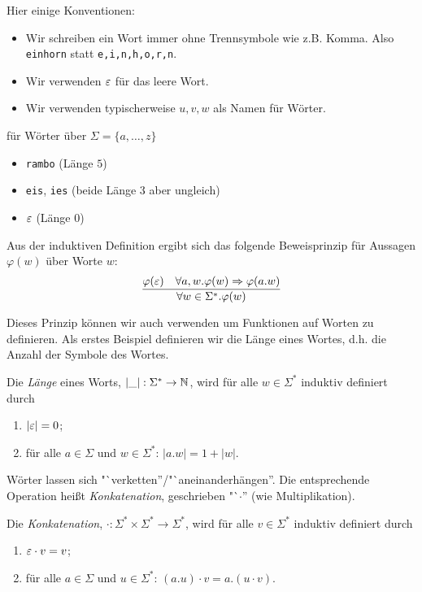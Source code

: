 Hier einige Konventionen:
\begin{itemize}
\item Wir schreiben ein Wort immer ohne Trennsymbole wie
  z.B. Komma. Also \texttt{einhorn} statt \texttt{e,i,n,h,o,r,n}.
\item Wir verwenden $\varepsilon$ für das leere Wort.
\item Wir verwenden typischerweise $u,v,w$ als Namen für Wörter.
\end{itemize}

\goodbreak

\begin{Bsp*} für Wörter über $\Sigma=\{a,\dots,z\}$
  \begin{itemize}
  \item \verb/rambo/ (Länge $5$)
  \item \verb/eis/, \verb/ies/ (beide Länge 3 aber ungleich) 
  \item $\varepsilon$ (Länge $0$)
  \qedhere
  \end{itemize}
\end{Bsp*}

Aus der induktiven Definition ergibt sich das folgende Beweisprinzip
für Aussagen $\varphi(w)$ über Worte $w$:
\begin{displaymath}
  \frac{\varphi(\varepsilon) \quad \forall a,w. \varphi(w) \Rightarrow \varphi(a.w)}{\forall w\in\Sigma^*.\varphi(w)}
\end{displaymath}

Dieses Prinzip können wir auch verwenden um Funktionen auf Worten zu
definieren. Als erstes Beispiel definieren wir die Länge eines Wortes,
d.h. die Anzahl der Symbole des Wortes.
\begin{Def}
  Die \emph{Länge} eines Worts, $|\_| : \Sigma^* \to \mathbb{N}$, wird für
  alle $w \in \Sigma^*$ induktiv definiert durch
  \begin{enumerate}
  \item $|\varepsilon| = 0$;
  \item für alle $a\in\Sigma$ und $w\in \Sigma^*$:  $|a.w| = 1+|w|$.
  \end{enumerate}
\end{Def}

Wörter lassen sich "`verketten''/"`aneinanderhängen''.
Die entsprechende Operation heißt \emph{Konkatenation}, geschrieben "`$\cdot$'' (wie Multiplikation).
\begin{Def}
  Die \emph{Konkatenation}, $\mathord{\cdot} : \Sigma^* \times
  \Sigma^* \to \Sigma^*$, wird für alle $v\in\Sigma^*$ induktiv definiert durch
  \begin{enumerate}
  \item $\varepsilon \cdot v = v$;
  \item für alle $a\in\Sigma$ und $u\in \Sigma^*$:  $(a.u) \cdot v = a.(u \cdot v)$.
  \end{enumerate}
\end{Def}

